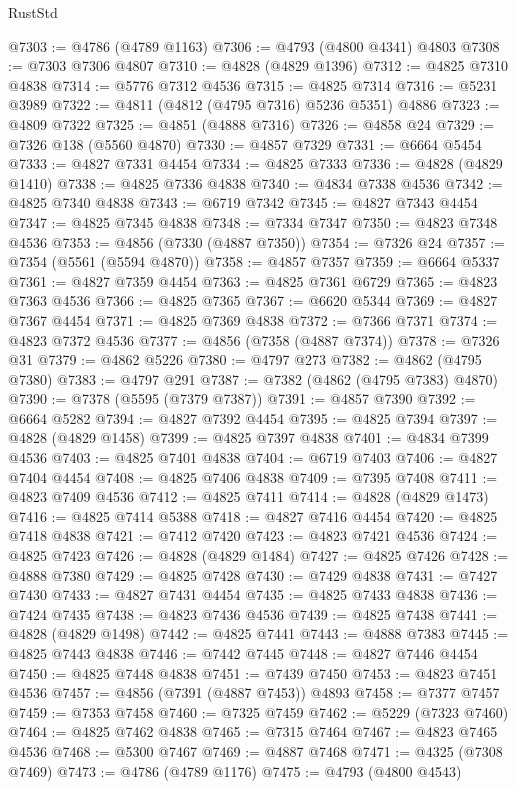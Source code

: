 \begin{lexlean}{RustStd}
\begin{coremodule}
{\begin{coremodule}
{{{{{{{{{{{{{{{{{{{{{{{{{{{{{{{{{{{{{{{{{{{{{{{{{{{{{{{{{{{{{{{{{{{{{{{{{{{{{{{{@7303 := @4786 (@4789 @1163)
@7306 := @4793 (@4800 @4341) @4803
@7308 := @7303 @7306 @4807
@7310 := @4828 (@4829 @1396)
@7312 := @4825 @7310 @4838
@7314 := @5776 @7312 @4536
@7315 := @4825 @7314
@7316 := @5231 @3989
@7322 := @4811 (@4812 (@4795 @7316) @5236 @5351) @4886
@7323 := @4809 @7322
@7325 := @4851 (@4888 @7316)
@7326 := @4858 @24
@7329 := @7326 @138 (@5560 @4870)
@7330 := @4857 @7329
@7331 := @6664 @5454
@7333 := @4827 @7331 @4454
@7334 := @4825 @7333
@7336 := @4828 (@4829 @1410)
@7338 := @4825 @7336 @4838
@7340 := @4834 @7338 @4536
@7342 := @4825 @7340 @4838
@7343 := @6719 @7342
@7345 := @4827 @7343 @4454
@7347 := @4825 @7345 @4838
@7348 := @7334 @7347
@7350 := @4823 @7348 @4536
@7353 := @4856 (@7330 (@4887 @7350))
@7354 := @7326 @24
@7357 := @7354 (@5561 (@5594 @4870))
@7358 := @4857 @7357
@7359 := @6664 @5337
@7361 := @4827 @7359 @4454
@7363 := @4825 @7361 @6729
@7365 := @4823 @7363 @4536
@7366 := @4825 @7365
@7367 := @6620 @5344
@7369 := @4827 @7367 @4454
@7371 := @4825 @7369 @4838
@7372 := @7366 @7371
@7374 := @4823 @7372 @4536
@7377 := @4856 (@7358 (@4887 @7374))
@7378 := @7326 @31
@7379 := @4862 @5226
@7380 := @4797 @273
@7382 := @4862 (@4795 @7380)
@7383 := @4797 @291
@7387 := @7382 (@4862 (@4795 @7383) @4870)
@7390 := @7378 (@5595 (@7379 @7387))
@7391 := @4857 @7390
@7392 := @6664 @5282
@7394 := @4827 @7392 @4454
@7395 := @4825 @7394
@7397 := @4828 (@4829 @1458)
@7399 := @4825 @7397 @4838
@7401 := @4834 @7399 @4536
@7403 := @4825 @7401 @4838
@7404 := @6719 @7403
@7406 := @4827 @7404 @4454
@7408 := @4825 @7406 @4838
@7409 := @7395 @7408
@7411 := @4823 @7409 @4536
@7412 := @4825 @7411
@7414 := @4828 (@4829 @1473)
@7416 := @4825 @7414 @5388
@7418 := @4827 @7416 @4454
@7420 := @4825 @7418 @4838
@7421 := @7412 @7420
@7423 := @4823 @7421 @4536
@7424 := @4825 @7423
@7426 := @4828 (@4829 @1484)
@7427 := @4825 @7426
@7428 := @4888 @7380
@7429 := @4825 @7428
@7430 := @7429 @4838
@7431 := @7427 @7430
@7433 := @4827 @7431 @4454
@7435 := @4825 @7433 @4838
@7436 := @7424 @7435
@7438 := @4823 @7436 @4536
@7439 := @4825 @7438
@7441 := @4828 (@4829 @1498)
@7442 := @4825 @7441
@7443 := @4888 @7383
@7445 := @4825 @7443 @4838
@7446 := @7442 @7445
@7448 := @4827 @7446 @4454
@7450 := @4825 @7448 @4838
@7451 := @7439 @7450
@7453 := @4823 @7451 @4536
@7457 := @4856 (@7391 (@4887 @7453)) @4893
@7458 := @7377 @7457
@7459 := @7353 @7458
@7460 := @7325 @7459
@7462 := @5229 (@7323 @7460)
@7464 := @4825 @7462 @4838
@7465 := @7315 @7464
@7467 := @4823 @7465 @4536
@7468 := @5300 @7467
@7469 := @4887 @7468
@7471 := @4325 (@7308 @7469)
@7473 := @4786 (@4789 @1176)
@7475 := @4793 (@4800 @4543)
}}}}}}}}}}}}}}}}}}}}}}}}}}}}}}}}}}}}}}}}}}}}}}}}}}}}}}}}}}}}}}}}}}}}}}}}}}}}}}}}
\end{coremodule}}
\end{coremodule}
\end{lexlean}
